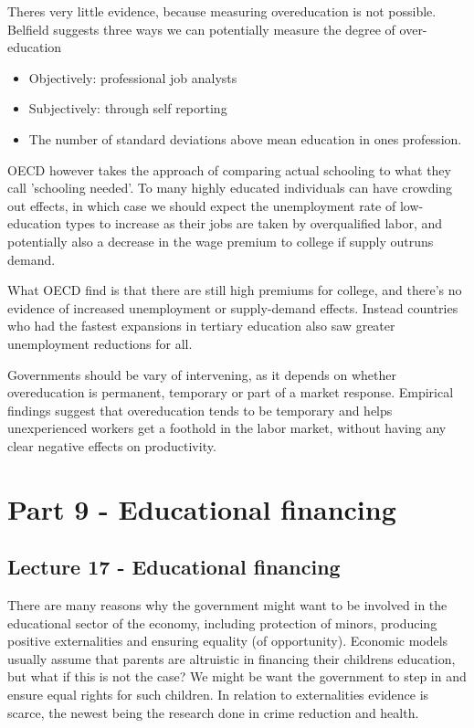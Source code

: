 \documentclass[12pt, a4paper]{article}
\begin{document}
\begin{multicols}{2}
Theres very little evidence, because measuring overeducation is not possible. Belfield suggests three ways we can potentially measure the degree of over-education
\begin{itemize}
\item Objectively: professional job analysts
\item Subjectively: through self reporting
\item The number of standard deviations above mean education in ones profession.
\end{itemize}
OECD however takes the approach of comparing actual schooling to what they call 'schooling needed'. To many highly educated individuals can have crowding out effects, in which case we should expect the unemployment rate of low-education types to increase as their jobs are taken by overqualified labor, and potentially also a decrease in the wage premium to college if supply outruns demand.

What OECD find is that there are still high premiums for college, and there's no evidence of increased unemployment or supply-demand effects. Instead countries who had the fastest expansions in tertiary education also saw greater unemployment reductions for all.

Governments should be vary of intervening, as it depends on whether overeducation is permanent, temporary or part of a market response. Empirical findings suggest that overeducation tends to be temporary and helps unexperienced workers get a foothold in the labor market, without having any clear negative effects on productivity.

\section{Part 9 - Educational financing}
\subsection{Lecture 17 - Educational financing}
There are many reasons why the government might want to be involved in the educational sector of the economy, including protection of minors, producing positive externalities and ensuring equality (of opportunity). Economic models usually assume that parents are altruistic in financing their childrens education, but what if this is not the case? We might be want the government to step in and ensure equal rights for such children. In relation to externalities evidence is scarce, the newest being the research done in crime reduction and health.


\end{multicols}
\end{document}
